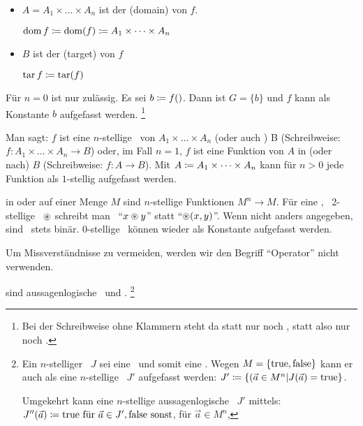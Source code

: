 \begin{description}
\begin{itemize}
		\item $A = A_1 \times \dots \times A_n$ ist der  (domain) von $f$.

		$\operatorname*{dom} f \coloneqq \operatorname*{dom}(f) \coloneqq A_1 \times \dots \times A_n$

		\item $B$ ist der  (target) von $f$

		$\operatorname*{tar} f \coloneqq \operatorname*{tar}(f)$
	\end{itemize}
	Für $n = 0$ ist nur  zulässig. Es sei $b \coloneqq f()$. Dann ist $G = \{b\}$ und $f$ kann als Konstante $b$ aufgefasst werden.%
	\footnote{%
		Bei der Schreibweise ohne Klammern steht da statt  nur noch , statt  also nur noch .
	}

	Man sagt: $f$ ist eine $n$-stellige \Funktion\ von $A_1 \times \dots \times A_n$  (oder auch ) B (Schreibweise: $f : A_1 \times \dots \times A_n \rightarrow B$) oder, im Fall $n=1$, $f$ ist eine Funktion von $A$ in (oder nach) $B$ (Schreibweise: $f : A \rightarrow B$). Mit $A \coloneqq A_1 \times \dots \times A_n$ kann für $n > 0$ jede Funktion als $1$-stellig aufgefasst werden.

	\item [\Operationen] in oder auf einer Menge $M$ sind $n$-stellige Funktionen $M^n \rightarrow M$.
	Für eine , \textdh\ 2-stellige \Operation\ $\mathbin\circledast$ schreibt man \textiAlg\ \enquote{$x \mathbin\circledast y$} statt \enquote{$\mathbin\circledast(x,y)$}.
	Wenn nicht anders angegeben, sind \Operationen\ stets binär.
	0-stellige \Operationen\ können wieder als Konstante aufgefasst werden.

	Um Missverständnisse zu vermeiden, werden wir den Begriff \enquote{Operator} nicht verwenden.

	\item [\Junktoren] sind aussagenlogische \Relationen\ und \Operationen.%
	\footnote{%
		Ein $n$-stelliger \Junktor\ $J$ sei eine \Operation\ und somit eine \Funktion.
		Wegen $M = \{\mathrm{true},\mathrm{false}\}$ kann er auch als eine $n$-stellige \Relation\ $J'$ aufgefasst werden:
		$J' \coloneqq \{(\vec{a} \in M^n | J(\vec{a}) = \mathrm{true}\}$.

		Umgekehrt kann eine $n$-stellige aussagenlogische \Relation\ $J'$ mittels:
		$J''(\vec{a}) \coloneqq \mathrm{true} \text{ für } \vec{a} \in J', \mathrm{false} \text{ sonst}$, für $\vec{a} \in M^n$,

}
\end{description}
